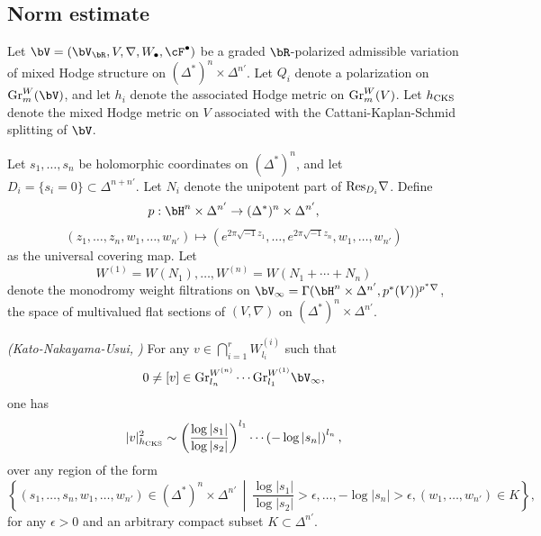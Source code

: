 \documentclass[11pt,letterpaper]{amsart}
\numberwithin{equation}{section}
\begin{document}
	\subsection{Norm estimate}
	Let $\bV = (\bV_{\bR}, V, \nabla, W_\bullet, \cF^\bullet)$ be a graded $\bR$-polarized admissible variation of mixed Hodge structure on $(\Delta^\ast)^n \times \Delta^{n'}$. Let $Q_i$ denote a polarization on ${\rm Gr}^W_m(\bV)$, and let $h_i$ denote the associated Hodge metric on ${\rm Gr}^W_m(V)$. Let $h_{\rm CKS}$ denote the mixed Hodge metric on $V$ associated with the Cattani-Kaplan-Schmid splitting of $\bV$.
	
	Let $s_1, \dots, s_n$ be holomorphic coordinates on $(\Delta^\ast)^n$, and let $D_i = \{s_i = 0\} \subset \Delta^{n+n'}$. Let $N_i$ denote the unipotent part of ${\rm Res}_{D_i} \nabla$. Define  
	$$
	p: \bH^n \times \Delta^{n'} \to (\Delta^\ast)^n \times \Delta^{n'},
	$$  
	$$
	(z_1, \dots, z_n, w_1, \dots, w_{n'}) \mapsto (e^{2\pi\sqrt{-1}z_1}, \dots, e^{2\pi\sqrt{-1}z_n}, w_1, \dots, w_{n'})
	$$  
	as the universal covering map. Let  
	$$
	W^{(1)} = W(N_1), \dots, W^{(n)} = W(N_1 + \cdots + N_n)
	$$  
	denote the monodromy weight filtrations on $\bV_\infty = \Gamma(\bH^n \times \Delta^{n'}, p^\ast(V))^{p^\ast\nabla}$, the space of multivalued flat sections of $(V, \nabla)$ on $(\Delta^\ast)^n \times \Delta^{n'}$.
	\begin{thm} \emph{(Kato-Nakayama-Usui, \cite[Theorem 12.4]{Kato2008})} \label{thm_Hodge_metric_asymptotic}  
		For any $v \in \bigcap_{i=1}^r W^{(i)}_{l_i}$ such that  
		$$
		0 \neq [v] \in {\rm Gr}_{l_n}^{W^{(n)}} \cdots {\rm Gr}_{l_1}^{W^{(1)}} \bV_\infty,
		$$  
		one has  
		\begin{align*}  
			|v|^2_{h_{\rm CKS}} \sim \left(\frac{\log|s_1|}{\log|s_2|}\right)^{l_1} \cdots \left(-\log|s_n|\right)^{l_n},  
		\end{align*}  
		over any region of the form  
		$$
		\left\{(s_1, \dots, s_n, w_1, \dots, w_{n'}) \in (\Delta^\ast)^n \times \Delta^{n'} \,\middle|\, \frac{\log|s_1|}{\log|s_2|} > \epsilon, \dots, -\log|s_n| > \epsilon, (w_1, \dots, w_{n'}) \in K \right\},
		$$  
		for any $\epsilon > 0$ and an arbitrary compact subset $K \subset \Delta^{n'}$.  
	\end{thm}
	\fi
\end{document}

